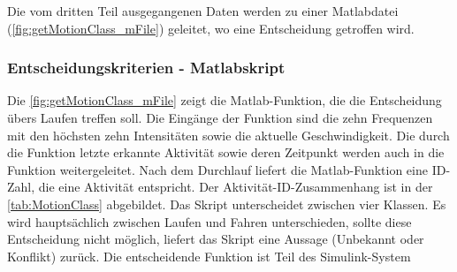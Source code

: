 Die vom dritten Teil ausgegangenen Daten werden zu einer Matlabdatei (\autoref{fig:getMotionClass_mFile}) geleitet, wo eine Entscheidung getroffen wird.
%
%
%

\subsubsection{Entscheidungskriterien - Matlabskript}
%
%
%
%
%
Die \autoref{fig:getMotionClass_mFile} zeigt die Matlab-Funktion, die die Entscheidung übers Laufen treffen soll. Die Eingänge der Funktion sind die zehn Frequenzen mit den höchsten zehn Intensitäten sowie die aktuelle Geschwindigkeit. Die durch die Funktion letzte erkannte Aktivität sowie deren Zeitpunkt werden auch in die Funktion weitergeleitet. Nach dem Durchlauf liefert die Matlab-Funktion eine ID-Zahl, die eine Aktivität entspricht. Der Aktivität-ID-Zusammenhang ist in der \autoref{tab:MotionClass} abgebildet. Das Skript unterscheidet zwischen vier Klassen. Es wird hauptsächlich zwischen Laufen und Fahren unterschieden, sollte diese Entscheidung nicht möglich, liefert das Skript eine Aussage (Unbekannt oder Konflikt) zurück.
Die entscheidende Funktion ist Teil des Simulink-System

